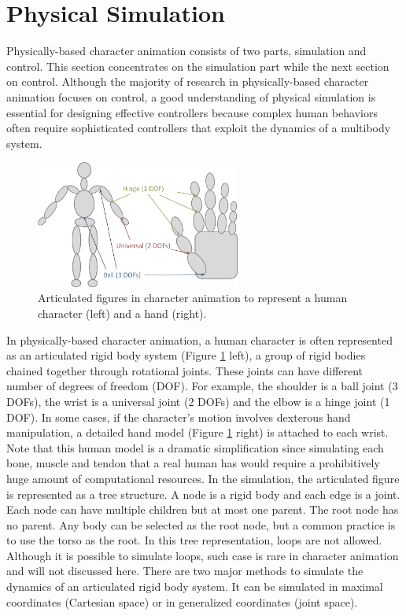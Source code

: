 \section{Physical Simulation}

Physically-based character animation consists of two parts, simulation and control. This section concentrates on the simulation part while the next section on control. Although the majority of research in physically-based character animation focuses on control, a good understanding of physical simulation is essential for designing effective controllers because complex human behaviors often require sophisticated controllers that exploit the dynamics of a multibody system.

\begin{figure}[h]
  \centering
  \includegraphics[width=0.6\textwidth]{figures/character}
  \caption{Articulated figures in character animation to represent a human character (left) and a hand (right).}
  \label{fig:character}
\end{figure}

In physically-based character animation, a human character is often represented as an articulated rigid body system (Figure \ref{fig:character} left), a group of rigid bodies chained together through rotational joints. These joints can have different number of degrees of freedom (DOF). For example, the shoulder is a ball joint (3 DOFs), the wrist is a universal joint (2 DOFs) and the elbow is a hinge joint (1 DOF). In some cases, if the character's motion involves dexterous hand manipulation, a detailed hand model (Figure \ref{fig:character} right) is attached to each wrist. Note that this human model is a dramatic simplification since simulating each bone, muscle and tendon that a real human has would require a prohibitively huge amount of computational resources. In the simulation, the articulated figure is represented as a tree structure. A node is a rigid body and each edge is a joint. Each node can have multiple children but at most one parent. The root node has no parent. Any body can be selected as the root node, but a common practice is to use the torso as the root. In this tree representation, loops are not allowed. Although it is possible to simulate loops, such case is rare in character animation and will not discussed here. There are two major methods to simulate the dynamics of an articulated rigid body system. It can be simulated in maximal coordinates (Cartesian space) or in generalized coordinates (joint space).



